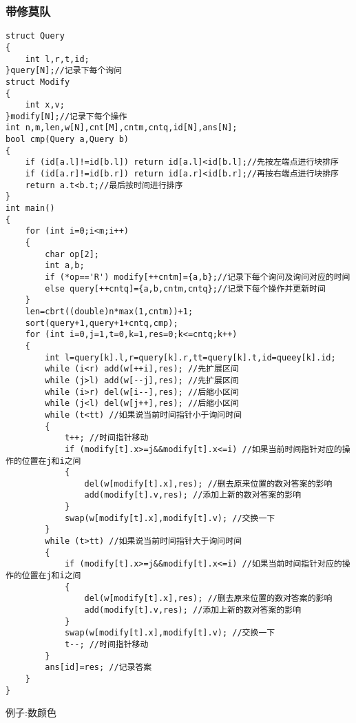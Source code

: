 \documentclass[a4paper]{ctexart}
\begin{document}
\subsubsection{带修莫队}
\begin{lstlisting}
struct Query
{
    int l,r,t,id;
}query[N];//记录下每个询问
struct Modify
{
    int x,v;
}modify[N];//记录下每个操作
int n,m,len,w[N],cnt[M],cntm,cntq,id[N],ans[N];
bool cmp(Query a,Query b)
{
    if (id[a.l]!=id[b.l]) return id[a.l]<id[b.l];//先按左端点进行块排序
    if (id[a.r]!=id[b.r]) return id[a.r]<id[b.r];//再按右端点进行块排序
    return a.t<b.t;//最后按时间进行排序
}
int main()
{
    for (int i=0;i<m;i++)
    {
        char op[2];
        int a,b;
        if (*op=='R') modify[++cntm]={a,b};//记录下每个询问及询问对应的时间
        else query[++cntq]={a,b,cntm,cntq};//记录下每个操作并更新时间
    }
    len=cbrt((double)n*max(1,cntm))+1;
    sort(query+1,query+1+cntq,cmp);
    for (int i=0,j=1,t=0,k=1,res=0;k<=cntq;k++)
    {
        int l=query[k].l,r=query[k].r,tt=query[k].t,id=queey[k].id;
        while (i<r) add(w[++i],res); //先扩展区间
        while (j>l) add(w[--j],res); //先扩展区间
        while (i>r) del(w[i--],res); //后缩小区间
        while (j<l) del(w[j++],res); //后缩小区间
        while (t<tt) //如果说当前时间指针小于询问时间
        {
            t++; //时间指针移动
            if (modify[t].x>=j&&modify[t].x<=i) //如果当前时间指针对应的操作的位置在j和i之间
            {
                del(w[modify[t].x],res); //删去原来位置的数对答案的影响
                add(modify[t].v,res); //添加上新的数对答案的影响
            }
            swap(w[modify[t].x],modify[t].v); //交换一下
        }
        while (t>tt) //如果说当前时间指针大于询问时间
        {
            if (modify[t].x>=j&&modify[t].x<=i) //如果当前时间指针对应的操作的位置在j和i之间
            {
                del(w[modify[t].x],res); //删去原来位置的数对答案的影响
                add(modify[t].v,res); //添加上新的数对答案的影响
            }
            swap(w[modify[t].x],modify[t].v); //交换一下
            t--; //时间指针移动
        }
        ans[id]=res; //记录答案
    }
}
\end{lstlisting}
例子:数颜色
\end{document}
